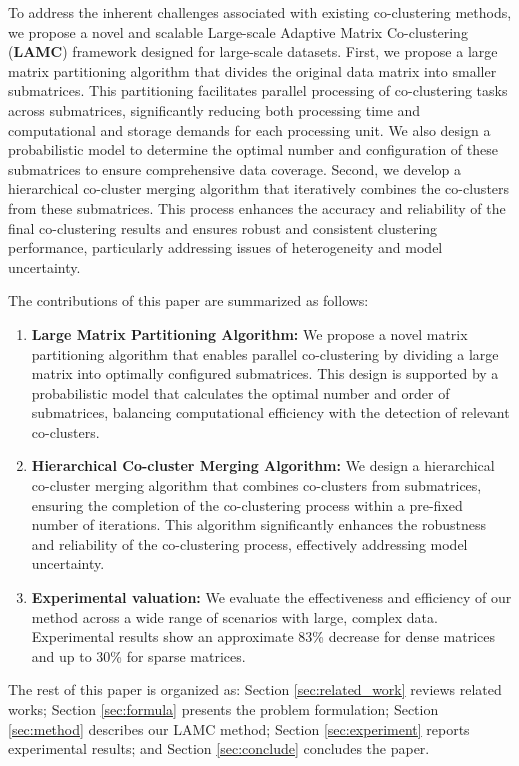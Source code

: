To address the inherent challenges associated with existing co-clustering methods, we propose a novel and scalable Large-scale Adaptive Matrix Co-clustering (\textbf{LAMC}) framework designed for large-scale datasets. First,  we propose a large matrix partitioning algorithm that divides the original data matrix into smaller submatrices. This partitioning facilitates parallel processing of co-clustering tasks across submatrices, significantly reducing both processing time and computational and storage demands for each processing unit. We also design a probabilistic model to determine the optimal number and configuration of these submatrices to ensure comprehensive data coverage.
Second, we develop a hierarchical co-cluster merging algorithm that iteratively combines the co-clusters from these submatrices. This process enhances the accuracy and reliability of the final co-clustering results and ensures robust and consistent clustering performance, particularly addressing issues of heterogeneity and model uncertainty.

The contributions of this paper are summarized as follows:
\begin{enumerate}
    \item \textbf{Large Matrix Partitioning Algorithm:}
          We propose a novel matrix partitioning algorithm that enables parallel co-clustering by dividing a large matrix into optimally configured submatrices. This design is supported by a probabilistic model that calculates the optimal number and order of submatrices, balancing computational efficiency with the detection of relevant co-clusters.
    \item \textbf{Hierarchical Co-cluster Merging Algorithm:}
          We design a hierarchical co-cluster merging algorithm that combines co-clusters from submatrices, ensuring the completion of the co-clustering process within a pre-fixed number of iterations. This algorithm significantly enhances the robustness and reliability of the co-clustering process, effectively addressing model uncertainty.
    \item \textbf{Experimental valuation:}
          We evaluate the effectiveness and efficiency of our method across a wide range of scenarios with large, complex data. Experimental results show an approximate 83\% decrease for dense matrices and up to 30\% for sparse matrices.
\end{enumerate}

The rest of this paper is organized as: Section \ref{sec:related_work} reviews related works; Section \ref{sec:formula} presents the problem formulation; Section \ref{sec:method} describes our LAMC method; Section \ref{sec:experiment} reports experimental results; and Section \ref{sec:conclude} concludes the paper.
